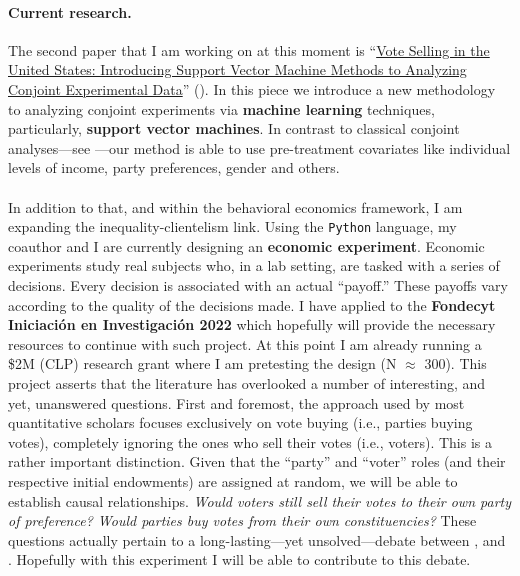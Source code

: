 \documentclass[letterpaper]{article}
\begin{document}
\paragraph{Current research.} The second paper that I am working on at this moment is ``\href{https://github.com/hbahamonde/Conjoint_US/raw/master/Bahamonde_Quininao_Conjoint_Letter_PA.pdf}{Vote Selling in the United States: Introducing Support Vector Machine Methods to Analyzing Conjoint Experimental Data}'' (\emph{\unskip}). In this piece we introduce a new methodology to analyzing conjoint experiments via {\bf machine learning} techniques, particularly, {\bf support vector machines}. In contrast to classical conjoint analyses---see \textcite{Hainmueller2014a}---our method is able to use pre-treatment covariates like individual levels of income, party preferences, gender and others. 

\paragraph{}In addition to that, and within the behavioral economics framework, I am expanding the inequality-clientelism link. Using the \texttt{Python} language, my coauthor and I are currently designing an {\bf economic experiment}. Economic experiments study real subjects who, in a lab setting, are tasked with a series of decisions. Every decision is associated with an actual ``payoff.'' These payoffs vary according to the quality of the decisions made. I have applied to the {\bf Fondecyt Iniciaci\'on en Investigaci\'on 2022} which hopefully will provide the necessary resources to continue with such project. At this point I am already running a \$2M (CLP) research grant where I am pretesting the design (N $\approx$ 300).  This project asserts that the literature has overlooked a number of interesting, and yet, unanswered questions. First and foremost, the approach used by most quantitative scholars focuses exclusively on vote buying (i.e., parties buying votes), completely ignoring the ones who sell their votes (i.e., voters). This is a rather important distinction. Given that the ``party'' and ``voter'' roles (and their respective initial endowments) are assigned at random, we will be able to establish causal relationships. \emph{Would voters still sell their votes to their own party of preference? Would parties buy votes from their own constituencies?} These questions actually pertain to a long-lasting---yet unsolved---debate between \textcite{Dixit1996}, \textcite{Cox1986} and \textcite{Stokes2005}. Hopefully with this experiment I will be able to contribute to this debate.
\end{document}
